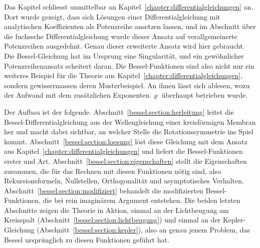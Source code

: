 Das Kapitel schliesst unmittelbar an Kapitel~\ref{chapter:differentialgleichungen} an.
Dort wurde gezeigt, dass sich Lösungen einer Differentialgleichung mit analytischen Koeffizienten als Potenzreihe ansetzen lassen, und im Abschnitt über die fuchssche Differentialgleichung wurde dieser Ansatz auf verallgemeinerte Potenzreihen ausgedehnt.
Genau dieser erweiterte Ansatz wird hier gebraucht.
Die Bessel-Gleichung hat im Ursprung eine Singularität, und ein gewöhnlicher Potenzreihenansatz scheitert daran.
Die Bessel-Funktionen sind also nicht nur ein weiteres Beispiel für die Theorie aus Kapitel~\ref{chapter:differentialgleichungen}, sondern gewissermassen deren Musterbeispiel.
An ihnen lässt sich ablesen, wozu der Aufwand mit dem zusätzlichen Exponenten $\varrho$ überhaupt betrieben wurde.

Der Aufbau ist der folgende.
Abschnitt~\ref{bessel:section:herleitung} leitet die Bessel-Differentialgleichung aus der Wellengleichung einer kreisförmigen Membran her und macht dabei sichtbar, an welcher Stelle die Rotationssymmetrie ins Spiel kommt.
Abschnitt~\ref{bessel:section:loesung} löst diese Gleichung mit dem Ansatz aus Kapitel~\ref{chapter:differentialgleichungen} und liefert die Bessel-Funktionen erster und Art.
Abschnitt~\ref{bessel:section:eigenschaften} stellt die Eigenschaften zusammen, die für das Rechnen mit diesen Funktionen nötig sind, also Rekursionsformeln, Nullstellen, Orthogonalität und asymptotisches Verhalten.
Abschnitt~\ref{bessel:section:modifiziert} behandelt die modifizierten
Bessel-Funktionen, die bei rein imaginärem Argument entstehen.
Die beiden letzten Abschnitte zeigen die Theorie in Aktion, einmal an der Lichtbeugung am Kreisspalt (Abschnitt~\ref{bessel:section:lichtbeugung}) und einmal an der Kepler-Gleichung (Abschnitt~\ref{bessel:section:kepler}), also an genau jenem Problem, das Bessel ursprünglich zu diesen Funktionen geführt hat.
